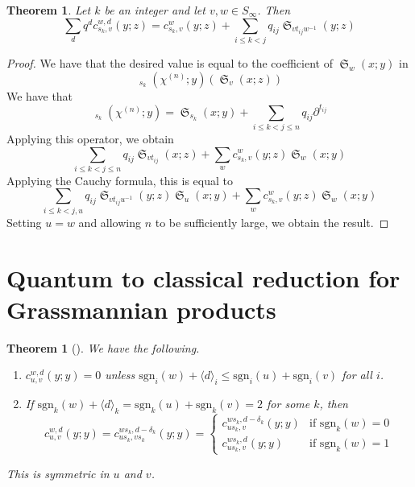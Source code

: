 \documentclass{amsart}
\newtheorem{theorem}[lemma]{Theorem}
\theoremstyle{definition}
\theoremstyle{remark}
\numberwithin{equation}{section}
\DeclareMathOperator{\sch}{\mathfrak{S}}
\DeclareMathOperator{\qsch}{\widetilde{\mathfrak{S}}}
\begin{document}
\begin{theorem}
Let $k$ be an integer and let $v,w\in S_\infty$. Then
$$\sum_d q^dc_{s_k,v}^{w,d}(y;z)=c_{s_k,v}^{w}(y;z)+\sum_{i\leq k < j} q_{ij}\sch_{vt_{ij}w^{-1}}(y;z)$$
\end{theorem}
\begin{proof}
We have that the desired value is equal to the coefficient of $\sch_w(x;y)$ in
$$\qsch_{s_k}(\chi^{(n)};y)(\sch_{v}(x;z))$$
We have that
$$\qsch_{s_k}(\chi^{(n)};y)=\sch_{s_k}(x;y)+\sum_{i\leq k<j\leq n}q_{ij}\partial^{t_{ij}}$$
Applying this operator, we obtain
$$\sum_{i\leq k<j\leq n} q_{ij}\sch_{vt_{ij}}(x;z)+\sum_w c_{s_k,v}^w(y;z)\sch_w(x;y)$$
Applying the Cauchy formula, this is equal to
$$\sum_{i\leq k<j,u} q_{ij}\sch_{vt_{ij}u^{-1}}(y;z)\sch_u(x;y)+\sum_w c_{s_k,v}^w(y;z)\sch_w(x;y)$$
Setting $u=w$ and allowing $n$ to be sufficiently large, we obtain the result.
\end{proof}


\section{Quantum to classical reduction for Grassmannian products}

\begin{theorem}[{\cite[Theorem~2.7]{huang2015equivariant}}] \label{theorem:quantclass}
	We have the following.
	\begin{enumerate}
	\item $c_{u,v}^{w,d}(y;y)=0$ unless $\mathrm{sgn}_i(w)+\langle d\rangle_i\leq \mathrm{sgn}_i(u)+\mathrm{sgn}_i(v)$ for all $i$.
	\item If $\mathrm{sgn}_k(w)+\langle d\rangle_k=\mathrm{sgn}_k(u)+\mathrm{sgn}_k(v)=2$ for some $k$, then
	$$c_{u,v}^{w,d}(y;y)=c_{us_k,vs_k}^{ws_k,d-\delta_k}(y;y)=\begin{cases}
	c_{us_k,v}^{ws_k,d-\delta_k}(y;y) & \text{if $\mathrm{sgn}_k(w)=0$}\\
	c_{us_k,v}^{ws_k,d}(y;y) & \text{if $\mathrm{sgn}_k(w)=1$}
	\end{cases}$$
	\end{enumerate}
	This is symmetric in $u$ and $v$.
\end{theorem}
\end{document}
